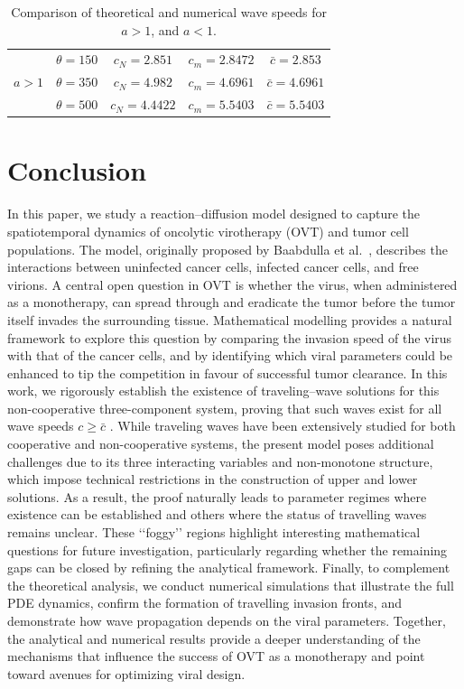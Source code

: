 \documentclass[11pt]{article}
\theoremstyle{definition}
\begin{document}
{\begin{table}[h!]
\begin{tabular}{|c|c|c|c|c|}
\multirow{3}{*}{$a>1$}
    & $\theta=150$ & $c_N=2.851$  & $c_m=2.8472$ & $\bar c=2.853$  \\
    & $\theta=350$ & $c_N=4.982$  & $c_m=4.6961$ & $\bar c=4.6961$ \\
    & $\theta=500$ & $c_N=4.4422$ & $c_m=5.5403$ & $\bar c=5.5403$ \\
\hline

\end{tabular}
\caption{Comparison of theoretical and numerical wave speeds for $a>1$, and $a<1$.}
\label{tab:speed_comparison}
\end{table}


\section{Conclusion}
In this paper, we study a reaction–diffusion model designed to capture the spatiotemporal dynamics of oncolytic virotherapy (OVT) and tumor cell populations. The model, originally proposed by Baabdulla et al.~\cite{arwa}, describes the interactions between uninfected cancer cells, infected cancer cells, and free virions. A central open question in OVT is whether the virus, when administered as a monotherapy, can spread through and eradicate the tumor before the tumor itself invades the surrounding tissue. Mathematical modelling provides a natural framework to explore this question by comparing the invasion speed of the virus with that of the cancer cells, and by identifying which viral parameters could be enhanced to tip the competition in favour of successful tumor clearance.
In this work, we rigorously establish the existence of traveling–wave solutions for this non-cooperative three-component system, proving that such waves exist for all wave speeds $c\ge \bar{c}$
 . While traveling waves have been extensively studied for both cooperative and non-cooperative systems, the present model poses additional challenges due to its three interacting variables and non-monotone structure, which impose technical restrictions in the construction of upper and lower solutions. As a result, the proof naturally leads to parameter regimes where existence can be established and others where the status of travelling waves remains unclear. These ‘‘foggy’’ regions highlight interesting mathematical questions for future investigation, particularly regarding whether the remaining gaps can be closed by refining the analytical framework.
Finally, to complement the theoretical analysis, we conduct numerical simulations that illustrate the full PDE dynamics, confirm the formation of travelling invasion fronts, and demonstrate how wave propagation depends on the viral parameters. Together, the analytical and numerical results provide a deeper understanding of the mechanisms that influence the success of OVT as a monotherapy and point toward avenues for optimizing viral design.}
\end{document}
